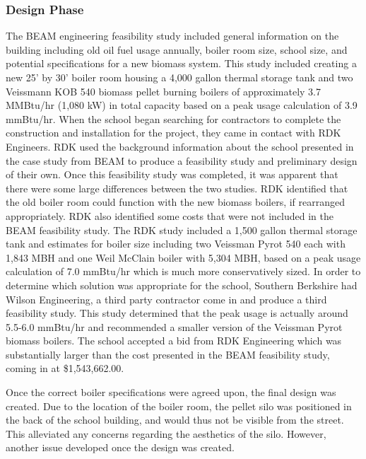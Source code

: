 \subsubsection{ Design Phase}
\par The BEAM engineering feasibility study included general information on the building including old oil fuel usage annually, boiler room size, school size, and potential specifications for a new biomass system. This study included creating a new 25’ by 30’ boiler room housing a 4,000 gallon thermal storage tank and two Veissmann KOB 540 biomass pellet burning  boilers of approximately 3.7 MMBtu/hr (1,080 kW) in total capacity based on a peak usage calculation of 3.9 mmBtu/hr. When the school began searching for contractors to complete the construction and installation for the project, they came in contact with RDK Engineers. RDK used the background information about the school presented in the case study from BEAM to produce a feasibility study and preliminary design of their own. Once this feasibility study was completed, it was apparent that there were some large differences between the two studies. RDK identified that the old boiler room could function with the new biomass boilers, if rearranged appropriately. RDK also identified some costs that were not included in the BEAM feasibility study. The RDK study included a 1,500 gallon thermal storage tank and estimates for boiler size including two Veissman Pyrot 540 each with 1,843 MBH and one Weil McClain boiler with 5,304 MBH, based on a peak usage calculation of 7.0 mmBtu/hr which is much more conservatively sized. In order to determine which solution was appropriate for the school, Southern Berkshire had Wilson Engineering, a third party contractor come in and produce a third feasibility study. This study determined that the peak usage is actually around 5.5-6.0 mmBtu/hr and recommended a smaller version of the Veissman Pyrot biomass boilers. The school accepted a bid from RDK Engineering which was substantially larger than the cost presented in the BEAM feasibility study, coming in at \$1,543,662.00.
\par Once the correct boiler specifications were agreed upon, the final design was created. Due to the location of the boiler room, the pellet silo was positioned in the back of the school building, and would thus not be visible from the street. This alleviated any concerns regarding the aesthetics of the silo. However, another issue developed once the design was created.
